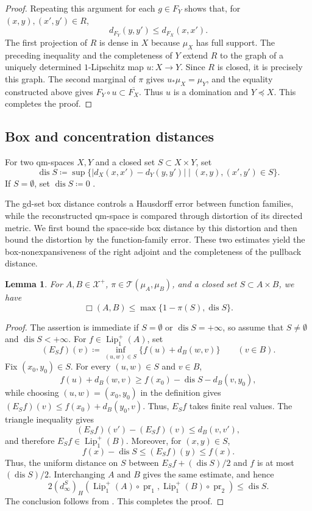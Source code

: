 \documentclass{amsart}
\theoremstyle{plain}
\newtheorem{lemma}[theorem]{Lemma}
\theoremstyle{definition}
\theoremstyle{remark}
\newcommand{\Xp}{\mathcal{X}^{+}}
\newcommand{\lipplus}{\operatorname{Lip}^{+}_{1}}
\DeclareMathOperator{\dis}{dis}
\DeclareMathOperator{\pr}{pr}
\newcommand{\dinf}[1]{d^{#1}_{\infty}}
\newcommand{\haus}[1]{\left(#1\right)_H}
\newcommand{\Tplan}{\mathcal{T}}
\begin{document}
\begin{proof}
Repeating this argument for each $g\in F_Y$ shows that, for
$(x,y),(x',y')\in R$,
\[d_{F_Y}(y,y')\leq d_{F_X}(x,x').\]
The first projection of $R$ is dense in $X$ because $\mu_X$ has full support.
The preceding inequality and the completeness of $Y$ extend $R$ to the graph of
a uniquely determined $1$-Lipschitz map $u\colon X\to Y$. Since $R$ is closed, it
is precisely this graph. The second marginal of $\pi$ gives $u_*\mu_X=\mu_Y$, and
the equality constructed above gives $F_Y\circ u\subset\overline{F_X}$. Thus $u$
is a domination and $Y\preceq X$.
This completes the proof.
\end{proof}

\subsection{Box and concentration distances}

For two qm-spaces $X,Y$ and a closed set $S\subset X\times Y$, set
\[\dis S\coloneqq\sup\{|d_X(x,x')-d_Y(y,y')|\mid(x,y),(x',y')\in S\}.\]
If $S=\emptyset$, set $\dis S\coloneqq0$ \cite[Definition~5.2]{gds1}.

The gd-set box distance controls a Hausdorff error between function families, while the reconstructed qm-space is compared through distortion of its directed metric. We first bound the space-side box distance by this distortion and then bound the distortion by the function-family error. These two estimates yield the box-nonexpansiveness of the right adjoint and the completeness of the pullback distance.

\begin{lemma}
\label{lem:asymmetric-box-upper-by-distortion}
For $A,B\in\Xp$, $\pi\in\Tplan(\mu_A,\mu_B)$, and a closed set $S\subset A\times B$, we have
\[\Box(A,B)\leq\max\{1-\pi(S),\dis S\}.\]
\end{lemma}

\begin{proof}
The assertion is immediate if $S=\emptyset$ or $\dis S=+\infty$, so assume that $S\neq\emptyset$ and $\dis S<+\infty$. For $f\in\lipplus(A)$, set
\[(E_Sf)(v)\coloneqq\inf_{(u,w)\in S}\{f(u)+d_B(w,v)\}\qquad(v\in B).\]
Fix $(x_0,y_0)\in S$. For every $(u,w)\in S$ and $v\in B$,
\[f(u)+d_B(w,v)\geq f(x_0)-\dis S-d_B(v,y_0),\]
while choosing $(u,w)=(x_0,y_0)$ in the definition gives
$(E_Sf)(v)\leq f(x_0)+d_B(y_0,v)$. Thus, $E_Sf$ takes finite real values. The triangle inequality gives
\[(E_Sf)(v')-(E_Sf)(v)\leq d_B(v,v'),\]
and therefore $E_Sf\in\lipplus(B)$. Moreover, for $(x,y)\in S$,
\[f(x)-\dis S\leq(E_Sf)(y)\leq f(x).\]
Thus, the uniform distance on $S$ between $E_Sf+(\dis S)/2$ and $f$ is at most $(\dis S)/2$. Interchanging $A$ and $B$ gives the same estimate, and hence
\[2\haus{\dinf{S}}(\lipplus(A)\circ\pr_1,\lipplus(B)\circ\pr_2)\leq\dis S.\]
The conclusion follows from .
This completes the proof.
\end{proof}
\end{document}
